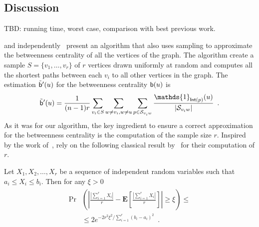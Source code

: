 \subsection{Discussion}\label{sec:discussion}
\XXX TBD: running time, worst case, comparison with best previous work.

\citet{JacobKLPT05} and independently~\citet{BrandesP07} present an algorithm
that also uses sampling to approximate the betweenness centrality of all the
vertices of the graph. The algorithm create a sample $S=\{v_1,\dotsc,v_r\}$ of
$r$ vertices drawn uniformly at random and computes all the shortest paths
between each $v_i$ to all other vertices in the graph. The estimation
$\tilde{\mathsf{b}}'(u)$ for the betweenness centrality $\mathsf{b}(u)$ is
\[ 
\tilde\betw'(u)= \frac{1}{(n-1)r}\sum_{v_i\in S}\sum_{w\neq v_i,w\neq
u}\sum_{p\in\mathcal{S}_{v_iw}}\frac{\mathds{1}_{\mathsf{Int}(p)}(u)}{|\mathcal{S}_{v_iw}|}\enspace.
\]
As it was for our algorithm, the key ingredient to ensure a correct
approximation for the betweenness centrality is the computation of the sample
size $r$. Inspired by the work of~\citet{EppsteinW04}, \citet{BrandesP07} rely
on the following classical result by~\citet{Hoeffding63} for their computation
of $r$.

\begin{theorem}
  Let $X_1,X_2,\dotsc,X_r$ be a sequence of independent random variables
  such that $a_i\leq X_i\leq b_i$. Then for any $\xi > 0$
  \begin{align}\label{eq:hoeffding}
    \begin{split}
      \Pr&\left(\left|\frac{|\sum_{i=1}^rX_i|}{r}-\mathbf{E}\left[\frac{|\sum_{i=1}^rX_i|}{r}\right]\right|\geq
    \xi\right)\le \\
      &\leq 2e^{-2r^2\xi^2/\sum_{i=1}^{r}(b_{i}-a_{i})^2}\enspace.
    \end{split}
  \end{align}
\end{theorem}

